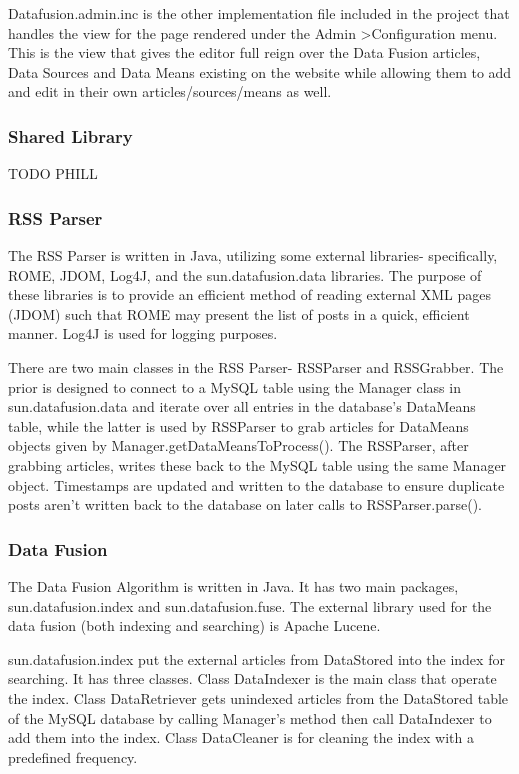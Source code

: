 \documentclass[11pt]{article} %
\begin{document}
Datafusion.admin.inc is the other implementation file included in the project that handles the view for the page rendered under the Admin \textgreater Configuration menu. This is the view that gives the editor full reign over the Data Fusion articles, Data Sources and Data Means existing on the website while allowing them to add and edit in their own articles/sources/means as well.

\subsubsection{Shared Library}

TODO PHILL

\subsubsection{RSS Parser}

The RSS Parser is written in Java, utilizing some external libraries- specifically, ROME, JDOM, Log4J, and the sun.datafusion.data libraries. The purpose of these libraries is to provide an efficient method of reading external XML pages (JDOM) such that ROME may present the list of posts in a quick, efficient manner. Log4J is used for logging purposes.

There are two main classes in the RSS Parser- RSSParser and RSSGrabber. The prior is designed to connect to a MySQL table using the Manager class in sun.datafusion.data and iterate over all entries in the database’s DataMeans table, while the latter is used by RSSParser to grab articles for DataMeans objects given by Manager.getDataMeansToProcess(). The RSSParser, after grabbing articles, writes these back to the MySQL table using the same Manager object. Timestamps are updated and written to the database to ensure duplicate posts aren’t written back to the database on later calls to RSSParser.parse().

\subsubsection{Data Fusion}

The Data Fusion Algorithm is written in Java. It has two main packages, sun.datafusion.index and sun.datafusion.fuse. The external library used for the data fusion (both indexing and searching) is Apache Lucene.

sun.datafusion.index put the external articles from DataStored into the index for searching. It has three classes. Class DataIndexer is the main class that operate the index. Class DataRetriever gets unindexed articles from the DataStored table of the MySQL database by calling Manager’s method then call DataIndexer to add them into the index. Class DataCleaner is for cleaning the index with a predefined frequency.
\end{document}
